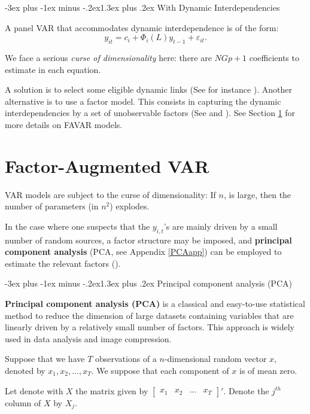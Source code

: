 \documentclass[
  11pt,
]{book}
\makeatletter
\renewcommand\section{\@startsection{section}{1}{\z@}
  {-3ex plus -1ex minus -.2ex}{1.3ex plus .2ex}
  {\normalfont\Large\bfseries\color{TextbookInk}}}
\theoremstyle{definition}
\theoremstyle{definition}
\theoremstyle{definition}
\theoremstyle{definition}
\theoremstyle{remark}
\makeatother
\begin{document}
\section{With Dynamic Interdependencies}\label{with-dynamic-interdependencies}

A panel VAR that accommodates dynamic interdependence is of the form:
\[ y_{it}=c_i+\Phi_i(L)
y_{t-1}+\varepsilon_{it}.\]

We face a serious \emph{curse of dimensionality} here: there are \(NGp+1\) coefficients to estimate in
each equation.

A solution is to select some eligible dynamic links (See for instance \citet{DelNegro_Schorfheide_2010}). Another alternative is to use a factor model. This consists in capturing the dynamic interdependencies by a set of unobservable factors (See \citet{Canova_Cicarelli_2004} and \citet{Canova_Cicarelli_2009}). See Section \ref{FAVAR} for more details on FAVAR models.

\chapter{Factor-Augmented VAR}\label{FAVAR}

VAR models are subject to the curse of dimensionality: If \(n\), is large, then the number of parameters (in \(n^2\)) explodes.

In the case where one suspects that the \(y_{i,t}\)'s are mainly driven by a small number of random sources, a factor structure may be imposed, and \textbf{principal component analysis} (PCA, see Appendix \ref{PCAapp}) can be employed to estimate the relevant factors (\citet{Bernanke_Boivin_Eliasz_2005}).

\section{Principal component analysis (PCA)}\label{PCAapp}

\textbf{Principal component analysis (PCA)} is a classical and easy-to-use statistical method to reduce the dimension of large datasets containing variables that are linearly driven by a relatively small number of factors. This approach is widely used in data analysis and image compression.

Suppose that we have \(T\) observations of a \(n\)-dimensional random vector \(x\), denoted by \(x_{1},x_{2},\ldots,x_{T}\). We suppose that each component of \(x\) is of mean zero.

Let denote with \(X\) the matrix given by \(\left[\begin{array}{cccc}
x_{1} & x_{2} & \ldots & x_{T}\end{array}\right]'\). Denote the \(j^{th}\) column of \(X\) by \(X_{j}\).
\end{document}
